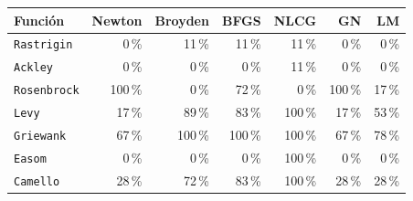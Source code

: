 \begin{tabular}{l r r r r r r}
\toprule
\rowcolor{Azul1!50}
Función & Newton & Broyden & BFGS & NLCG & GN & LM \\
\midrule
\texttt{Rastrigin} & 0\,\% & 11\,\% & 11\,\% & 11\,\% & 0\,\% & 0\,\% \\
\texttt{Ackley} & 0\,\% & 0\,\% & 0\,\% & 11\,\% & 0\,\% & 0\,\% \\
\texttt{Rosenbrock} & 100\,\% & 0\,\% & 72\,\% & 0\,\% & 100\,\% & 17\,\% \\
\texttt{Levy} & 17\,\% & 89\,\% & 83\,\% & 100\,\% & 17\,\% & 53\,\% \\
\texttt{Griewank} & 67\,\% & 100\,\% & 100\,\% & 100\,\% & 67\,\% & 78\,\% \\
\texttt{Easom} & 0\,\% & 0\,\% & 0\,\% & 100\,\% & 0\,\% & 0\,\% \\
\texttt{Camello} & 28\,\% & 72\,\% & 83\,\% & 100\,\% & 28\,\% & 28\,\% \\
\bottomrule
\end{tabular}
